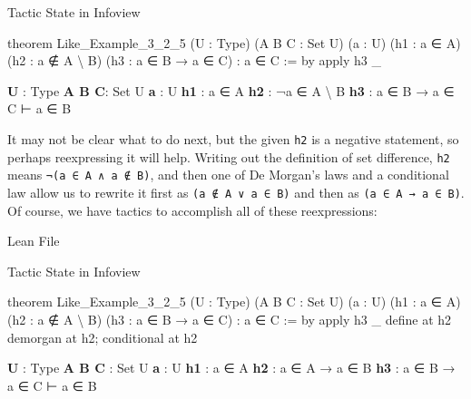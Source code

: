\documentclass[
  letterpaper,
  DIV=11,
  numbers=noendperiod]{scrreprt}
\newenvironment{Shaded}{\begin{snugshade}}{\end{snugshade}}
\newcommand{\InformationTok}[1]{\textcolor[rgb]{0.37,0.37,0.37}{#1}}
\newcommand{\KeywordTok}[1]{\textcolor[rgb]{0.00,0.23,0.31}{#1}}
\newcommand{\NormalTok}[1]{\textcolor[rgb]{0.00,0.23,0.31}{#1}}
\renewcommand{\KeywordTok}[1]{\textcolor[HTML]{0000FF}{#1}}
\renewcommand{\InformationTok}[1]{\textcolor[HTML]{D2691E}{\textbf{#1}}}
\begin{document}
Tactic State in Infoview

\begin{Shaded}
\begin{Highlighting}[]
\KeywordTok{theorem}\NormalTok{ Like\_Example\_3\_2\_5}
\NormalTok{(U : Type) (A B C : Set U) (a : U)}
\NormalTok{(h1 : a ∈ A) (h2 : a ∉ A \textbackslash{} B)}
\NormalTok{(h3 : a ∈ B → a ∈ C) : a ∈ C := }\KeywordTok{by}
  \KeywordTok{apply}\NormalTok{ h3 \_}
\end{Highlighting}
\end{Shaded}

\begin{Shaded}
\begin{Highlighting}[]
\InformationTok{U }\NormalTok{: Type}
\InformationTok{A B C}\NormalTok{: Set U}
\InformationTok{a }\NormalTok{: U}
\InformationTok{h1 }\NormalTok{: a ∈ A}
\InformationTok{h2 }\NormalTok{: ¬a ∈ A \textbackslash{} B}
\InformationTok{h3 }\NormalTok{: a ∈ B → a ∈ C}
\NormalTok{⊢ a ∈ B}
\end{Highlighting}
\end{Shaded}

It may not be clear what to do next, but the given \texttt{h2} is a
negative statement, so perhaps reexpressing it will help. Writing out
the definition of set difference, \texttt{h2} means
\texttt{¬(a\ ∈\ A\ ∧\ a\ ∉\ B)}, and then one of De Morgan's laws and a
conditional law allow us to rewrite it first as
\texttt{(a\ ∉\ A\ ∨\ a\ ∈\ B)} and then as
\texttt{(a\ ∈\ A\ →\ a\ ∈\ B)}. Of course, we have tactics to accomplish
all of these reexpressions:

Lean File

Tactic State in Infoview

\begin{Shaded}
\begin{Highlighting}[]
\KeywordTok{theorem}\NormalTok{ Like\_Example\_3\_2\_5}
\NormalTok{(U : Type) (A B C : Set U) (a : U)}
\NormalTok{(h1 : a ∈ A) (h2 : a ∉ A \textbackslash{} B)}
\NormalTok{(h3 : a ∈ B → a ∈ C) : a ∈ C := }\KeywordTok{by}
  \KeywordTok{apply}\NormalTok{ h3 \_}
  \KeywordTok{define} \KeywordTok{at}\NormalTok{ h2}
  \KeywordTok{demorgan} \KeywordTok{at}\NormalTok{ h2; }\KeywordTok{conditional} \KeywordTok{at}\NormalTok{ h2}
\end{Highlighting}
\end{Shaded}

\begin{Shaded}
\begin{Highlighting}[]
\InformationTok{U }\NormalTok{: Type}
\InformationTok{A B C }\NormalTok{: Set U}
\InformationTok{a }\NormalTok{: U}
\InformationTok{h1 }\NormalTok{: a ∈ A}
\InformationTok{h2 }\NormalTok{: a ∈ A → a ∈ B}
\InformationTok{h3 }\NormalTok{: a ∈ B → a ∈ C}
\NormalTok{⊢ a ∈ B}
\end{Highlighting}
\end{Shaded}
\end{document}

